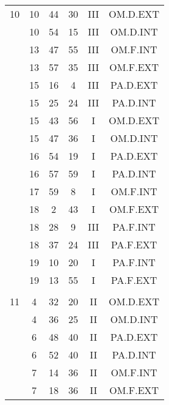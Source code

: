 \documentclass[12pt, a4paper]{article}
\begin{document}
\begin{multicols}{3}
{\begin{tabular}{c c c c c c}
	 	 	 	10 & 10 & 44 & 30 & III & OM.D.EXT\\%
	 	 	 	 & 10 & 54 & 15 & III & OM.D.INT\\%
	 	 	 	 & 13 & 47 & 55 & III & OM.F.INT\\%
	 	 	 	 & 13 & 57 & 35 & III & OM.F.EXT\\%
	 	 	 	 & 15 & 16 & 4 & III & PA.D.EXT\\%
	 	 	 	 & 15 & 25 & 24 & III & PA.D.INT\\%
	 	 	 	 & 15 & 43 & 56 & I & OM.D.EXT\\%
	 	 	 	 & 15 & 47 & 36 & I & OM.D.INT\\%
	 	 	 	 & 16 & 54 & 19 & I & PA.D.EXT\\%
	 	 	 	 & 16 & 57 & 59 & I & PA.D.INT\\%
	 	 	 	 & 17 & 59 & 8 & I & OM.F.INT\\%
	 	 	 	 & 18 & 2 & 43 & I & OM.F.EXT\\%
	 	 	 	 & 18 & 28 & 9 & III & PA.F.INT\\%
	 	 	 	 & 18 & 37 & 24 & III & PA.F.EXT\\%
	 	 	 	 & 19 & 10 & 20 & I & PA.F.INT\\%
	 	 	 	 & 19 & 13 & 55 & I & PA.F.EXT\\%
	 	 	 	 & & & & & \\%
	 	 	 	11 & 4 & 32 & 20 & II & OM.D.EXT\\%
	 	 	 	 & 4 & 36 & 25 & II & OM.D.INT\\%
	 	 	 	 & 6 & 48 & 40 & II & PA.D.EXT\\%
	 	 	 	 & 6 & 52 & 40 & II & PA.D.INT\\%
	 	 	 	 & 7 & 14 & 36 & II & OM.F.INT\\%
	 	 	 	 & 7 & 18 & 36 & II & OM.F.EXT\\%

\end{tabular}}
\end{multicols}
\end{document}
